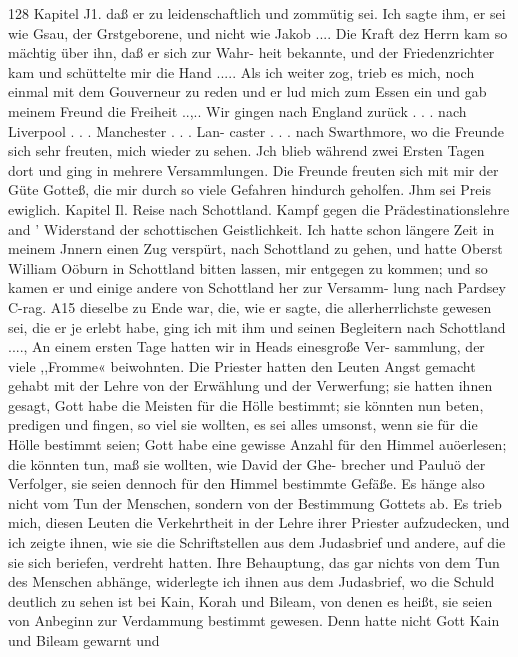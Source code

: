 128 Kapitel J1.
daß er zu leidenschaftlich und zommütig sei. Ich sagte ihm, er
sei wie Gsau, der Grstgeborene, und nicht wie Jakob .... Die
Kraft dez Herrn kam so mächtig über ihn, daß er sich zur Wahr-
heit bekannte, und der Friedenzrichter kam und schüttelte mir
die Hand ..... Als ich weiter zog, trieb es mich, noch einmal
mit dem Gouverneur zu reden und er lud mich zum Essen ein
und gab meinem Freund die Freiheit ..,.. Wir gingen nach
England zurück . . . nach Liverpool . . . Manchester . . . Lan-
caster . . . nach Swarthmore, wo die Freunde sich sehr freuten,
mich wieder zu sehen. Jch blieb während zwei Ersten Tagen
dort und ging in mehrere Versammlungen. Die Freunde freuten
sich mit mir der Güte Gotteß, die mir durch so viele Gefahren
hindurch geholfen. Jhm sei Preis ewiglich.
Kapitel Il.
Reise nach Schottland. Kampf gegen die Prädestinationslehre and '
Widerstand der schottischen Geistlichkeit.
Ich hatte schon längere Zeit in meinem Jnnern einen Zug
verspürt, nach Schottland zu gehen, und hatte Oberst William
Oöburn in Schottland bitten lassen, mir entgegen zu kommen; und
so kamen er und einige andere von Schottland her zur Versamm-
lung nach Pardsey C-rag. A15 dieselbe zu Ende war, die, wie
er sagte, die allerherrlichste gewesen sei, die er je erlebt habe,
ging ich mit ihm und seinen Begleitern nach Schottland ....,
An einem ersten Tage hatten wir in Heads einesgroße Ver-
sammlung, der viele ,,Fromme« beiwohnten. Die Priester hatten
den Leuten Angst gemacht gehabt mit der Lehre von der Erwählung
und der Verwerfung; sie hatten ihnen gesagt, Gott habe die Meisten
für die Hölle bestimmt; sie könnten nun beten, predigen und fingen,
so viel sie wollten, es sei alles umsonst, wenn sie für die Hölle
bestimmt seien; Gott habe eine gewisse Anzahl für den Himmel
auöerlesen; die könnten tun, maß sie wollten, wie David der Ghe-
brecher und Pauluö der Verfolger, sie seien dennoch für den
Himmel bestimmte Gefäße. Es hänge also nicht vom Tun der
Menschen, sondern von der Bestimmung Gottets ab. Es trieb
mich, diesen Leuten die Verkehrtheit in der Lehre ihrer Priester
aufzudecken, und ich zeigte ihnen, wie sie die Schriftstellen aus
dem Judasbrief und andere, auf die sie sich beriefen, verdreht
hatten. Ihre Behauptung, das gar nichts von dem Tun des
Menschen abhänge, widerlegte ich ihnen aus dem Judasbrief, wo
die Schuld deutlich zu sehen ist bei Kain, Korah und Bileam, von
denen es heißt, sie seien von Anbeginn zur Verdammung bestimmt
gewesen. Denn hatte nicht Gott Kain und Bileam gewarnt und
